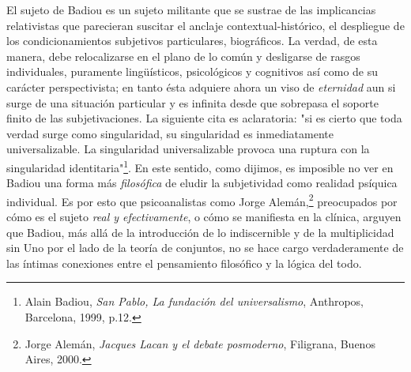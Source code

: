 \documentclass{book}
\begin{document}
El sujeto de Badiou es un sujeto militante que se sustrae de las
implicancias relativistas que parecieran suscitar el anclaje
contextual-histórico, el despliegue de los condicionamientos subjetivos
particulares, biográficos. La verdad, de esta manera, debe relocalizarse
en el plano de lo común y desligarse de rasgos individuales, puramente
lingüísticos, psicológicos y cognitivos así como de su carácter
perspectivista; en tanto ésta adquiere ahora un viso de \emph{eternidad}
aun si surge de una situación particular y es infinita desde que
sobrepasa el soporte finito de las subjetivaciones. La siguiente cita es
aclaratoria: "si es cierto que toda verdad surge como singularidad, su
singularidad es inmediatamente universalizable. La singularidad
universalizable provoca una ruptura con la singularidad
identitaria"\footnote{Alain Badiou, \emph{San Pablo, La fundación del
  universalismo}, Anthropos, Barcelona, 1999, p.12.}. En este sentido,
como dijimos, es imposible no ver en Badiou una forma más
\emph{filosófica} de eludir la subjetividad como realidad psíquica
individual. Es por esto que psicoanalistas como Jorge Alemán,\footnote{Jorge
  Alemán, \emph{Jacques Lacan y el debate posmoderno}, Filigrana, Buenos
  Aires, 2000.} preocupados por cómo es el sujeto \emph{real y
efectivamente}, o cómo se manifiesta en la clínica, arguyen que Badiou,
más allá de la introducción de lo indiscernible y de la multiplicidad
sin Uno por el lado de la teoría de conjuntos, no se hace cargo
verdaderamente de las íntimas conexiones entre el pensamiento filosófico
y la lógica del todo.
\end{document}

